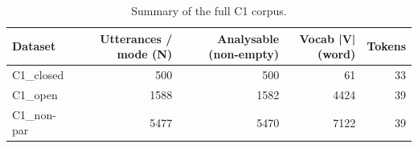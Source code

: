 \begin{table}
\caption{Summary of the full C1 corpus.}
\label{tab:corpus}
\begin{tabular}{lrrrr}
\toprule
Dataset & Utterances / mode (N) & Analysable (non-empty) & Vocab |V| (word) & Tokens \\
\midrule
C1_closed & 500 & 500 & 61 & 33 \\
C1_open & 1588 & 1582 & 4424 & 39 \\
C1_non-par & 5477 & 5470 & 7122 & 39 \\
\bottomrule
\end{tabular}
\end{table}
